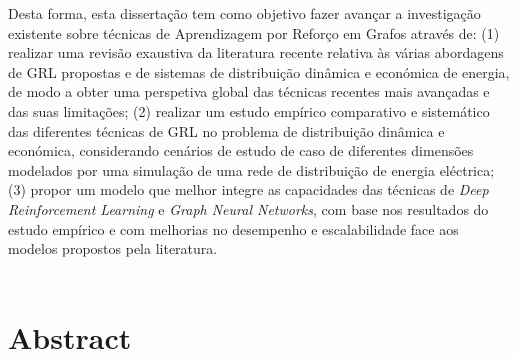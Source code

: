 Desta forma, esta dissertação tem como objetivo fazer avançar a investigação existente sobre técnicas de Aprendizagem por Reforço em Grafos através de: (1) realizar uma revisão exaustiva da literatura recente relativa às várias abordagens de GRL propostas e de sistemas de distribuição dinâmica e económica de energia, de modo a obter uma perspetiva global das técnicas recentes mais avançadas e das suas limitações; (2) realizar um estudo empírico comparativo e sistemático das diferentes técnicas de GRL no problema de distribuição dinâmica e económica, considerando cenários de estudo de caso de diferentes dimensões modelados por uma simulação de uma rede de distribuição de energia eléctrica; (3) propor um modelo que melhor integre as capacidades das técnicas de \textit{Deep Reinforcement Learning} e \textit{Graph Neural Networks}, com base nos resultados do estudo empírico e com melhorias no desempenho e escalabilidade face aos modelos propostos pela literatura. \\ \\



\chapter*{Abstract}


